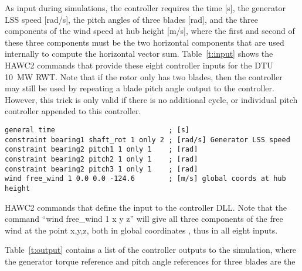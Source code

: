 As input during simulations, the controller requires the time [s], the generator LSS speed [rad/s], the pitch angles of three blades [rad], and the three components of the wind speed at hub height [m/s], where the first and second of these three components must be the two horizontal components that are used internally to compute the horizontal vector sum. Table~\ref{t:input} shows the HAWC2 commands that provide these eight controller inputs for the DTU 10~MW RWT. Note that if the rotor only has two blades, then the controller may still be used by repeating a blade pitch angle output to the controller. However, this trick is only valid if there is no additional cycle, or individual pitch controller appended to this controller.

\begin{table}[t]
\center
\begin{verbatim}
general time                           ; [s]
constraint bearing1 shaft_rot 1 only 2 ; [rad/s] Generator LSS speed
constraint bearing2 pitch1 1 only 1    ; [rad]
constraint bearing2 pitch2 1 only 1    ; [rad]
constraint bearing2 pitch3 1 only 1    ; [rad]
wind free_wind 1 0.0 0.0 -124.6        ; [m/s] global coords at hub height
\end{verbatim}
\caption{HAWC2 commands that define the input to the controller DLL. Note that the command ``wind free\_wind 1 x y z'' will give all three components of the free wind at the point x,y,z, both in global coordinates \cite{Larsen12}, thus in all eight inputs. \label{t:input}}
\end{table}

Table~\ref{t:output} contains a list of the controller outputs to the simulation, where the generator torque reference and pitch angle references for three blades are the

